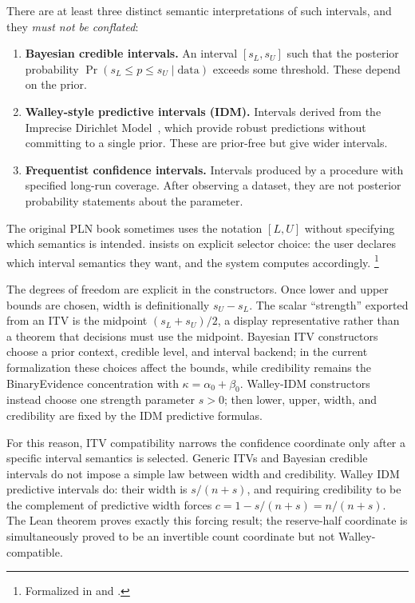 \documentclass[11pt,openany]{report}
\begin{document}
There are at least three distinct semantic interpretations of such
intervals, and they \emph{must not be conflated}:

\begin{enumerate}
\item \textbf{Bayesian credible intervals.}  An interval
  $[s_L, s_U]$ such that the posterior probability
  $\Pr(s_L \le p \le s_U \mid \text{data})$ exceeds some threshold.
  These depend on the prior.

\item \textbf{Walley-style predictive intervals (IDM).}  Intervals
  derived from the Imprecise Dirichlet Model~\cite{Walley1991,Walley1996BagOfMarbles},
  which provide robust predictions without committing to a single prior.
  These are prior-free but give wider intervals.

\item \textbf{Frequentist confidence intervals.}  Intervals produced by a
  procedure with specified long-run coverage.  After observing a dataset,
  they are not posterior probability statements about the parameter.
\end{enumerate}

The original PLN book sometimes uses the notation $[L, U]$ without
specifying which semantics is intended.  \xiPLN{} insists on explicit
selector choice: the user declares which interval semantics they want,
and the system computes accordingly.%
\footnote{Formalized in  and
.}

The degrees of freedom are explicit in the constructors.  Once lower and
upper bounds are chosen, width is definitionally $s_U-s_L$.  The scalar
``strength'' exported from an ITV is the midpoint $(s_L+s_U)/2$, a
display representative rather than a theorem that decisions must use the
midpoint.  Bayesian ITV constructors choose a prior context, credible
level, and interval backend; in the current formalization these choices
affect the bounds, while credibility remains the BinaryEvidence
concentration with $\kappa=\alpha_0+\beta_0$.  Walley-IDM constructors
instead choose one strength parameter $s>0$; then lower, upper, width,
and credibility are fixed by the IDM predictive formulas.

For this reason, ITV compatibility narrows the confidence coordinate
only after a specific interval semantics is selected.  Generic ITVs and
Bayesian credible intervals do not impose a simple law between width
and credibility.  Walley IDM predictive intervals do: their width is
$s/(n+s)$, and requiring credibility to be the complement of predictive
width forces $c=1-s/(n+s)=n/(n+s)$.  The Lean theorem
 proves exactly this
forcing result; the reserve-half coordinate is simultaneously proved to be
an invertible count coordinate but not Walley-compatible.
\end{document}

